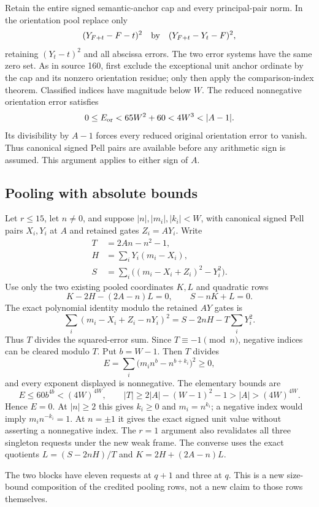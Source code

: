 Retain the entire signed semantic-anchor cap and every principal-pair norm.
In the orientation pool replace only
\[
 (Y_{F+t}-F-t)^2\quad\hbox{by}\quad(Y_{F+t}-Y_t-F)^2,
\]
retaining $(Y_t-t)^2$ and all abscissa errors.  The two error systems have the
same zero set.  As in source 160, first exclude the exceptional unit anchor
ordinate by the cap and its nonzero orientation residue; only then apply the
comparison-index theorem.  Classified indices have magnitude below $W$.
The reduced nonnegative orientation error satisfies
\[
 0\le E_{\rm or}<65W^2+60<4W^3<|A-1|.
\]
Its divisibility by $A-1$ forces every reduced original orientation error to vanish.
Thus canonical signed Pell pairs are available before any arithmetic sign is
assumed.  This argument applies to either sign of $A$.

\subsection*{Pooling with absolute bounds}
Let $r\le15$, let $n\ne0$, and suppose
$|n|,|m_i|,|k_i|<W$, with canonical signed Pell pairs $X_i,Y_i$ at $A$ and
retained gates $Z_i=AY_i$.  Write
\[
\begin{split}
 T&=2An-n^2-1,\\
 H&=\sum_iY_i(m_i-X_i),\\
 S&=\sum_i\bigl((m_i-X_i+Z_i)^2-Y_i^2\bigr).
\end{split}
\]
Use only the two existing pooled coordinates $K,L$ and quadratic rows
\[
 K-2H-(2A-n)L=0,\qquad S-nK+L=0.\tag{PP}
\]
The exact polynomial identity modulo the retained $AY$ gates is
\[
 \sum_i(m_i-X_i+Z_i-nY_i)^2=S-2nH-T\sum_iY_i^2.
\]
Thus $T$ divides the squared-error sum.  Since $T\equiv-1\pmod n$,
negative indices can be cleared modulo $T$.  Put $b=W-1$.  Then $T$ divides
\[
 E=\sum_i\bigl(m_i n^b-n^{b+k_i}\bigr)^2\ge0,
\]
and every exponent displayed is nonnegative.  The elementary bounds are
\[
 E\le60b^{4b}<(4W)^{4W},\qquad
 |T|\ge2|A|-(W-1)^2-1>|A|>(4W)^{4W}.
\]
Hence $E=0$.  At $|n|\ge2$ this gives $k_i\ge0$ and $m_i=n^{k_i}$; a negative
index would imply $m_i n^{-k_i}=1$.  At $n=\pm1$ it gives the exact signed
unit value without asserting a nonnegative index.  The $r=1$ argument also
revalidates all three singleton requests under the new weak frame.
The converse uses the exact quotients
$L=(S-2nH)/T$ and $K=2H+(2A-n)L$.

The two blocks have eleven requests at $q+1$ and three at $q$.
This is a new size-bound composition of the credited pooling rows, not a
new claim to those rows themselves.

